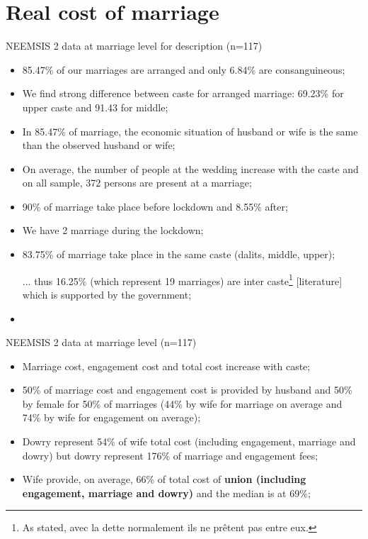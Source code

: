 \documentclass[a4paper, 11pt, onecolumn]{article}
\begin{document}
\section{Real cost of marriage}


NEEMSIS 2 data at marriage level for description (n=117)
\begin{itemize}[leftmargin=*]
\item 85.47\% of our marriages are arranged and only 6.84\% are consanguineous;
\item We find strong difference between caste for arranged marriage: 69.23\% for upper caste and 91.43 for middle;
\item In 85.47\% of marriage, the economic situation of husband or wife is the same than the observed husband or wife;
\item On average, the number of people at the wedding increase with the caste and on all sample, 372 persons are present at a marriage;
\item 90\% of marriage take place before lockdown and 8.55\% after;
\item We have 2 marriage during the lockdown;
\item 83.75\% of marriage take place in the same caste (dalits, middle, upper);
\item [...] thus 16.25\% (which represent 19 marriages) are inter caste\footnote{As \cite{Guerin2014a} stated, avec la dette normalement ils ne prêtent pas entre eux.} [literature] which is supported by the government;
\item 
\end{itemize}


NEEMSIS 2 data at marriage level (n=117)
\begin{itemize}[leftmargin=*]
\item Marriage cost, engagement cost and total cost increase with caste;
\item 50\% of marriage cost and engagement cost is provided by husband and 50\% by female for 50\% of marriages (44\% by wife for marriage on average and 74\% by wife for engagement on average);
\item Dowry represent 54\% of wife total cost (including engagement, marriage and dowry) but dowry represent 176\% of marriage and engagement fees;
\item Wife provide, on average, 66\% of total cost of \textbf{union (including engagement, marriage and dowry)} and the median is at 69\%;
\end{itemize}
\end{document}
